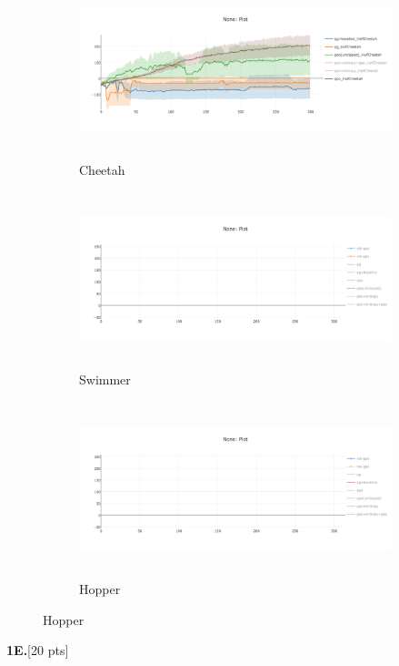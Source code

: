 \documentclass[10pt]{article}
\begin{document}
\begin{figure}[ht!]
    \centering
    \begin{subfigure}[h]{0.6\linewidth}
        \centering
        \includegraphics[height=2in]{figures/ppo_obj.png}
        \caption{Cheetah}
    \end{subfigure}
    \vskip 0.3in
    \begin{subfigure}[h]{0.6\textwidth}
        \centering
        \includegraphics[height=2in]{figures/newplot.png}
        \caption{Swimmer}
    \end{subfigure}
    \vskip 0.3in
    \begin{subfigure}[h]{0.6\textwidth}
        \centering
        \includegraphics[height=2in]{figures/newplot.png}
        \caption{Hopper}
    \end{subfigure}
\end{figure}
\clearpage
\textbf{1E.}[20 pts]
\end{document}

